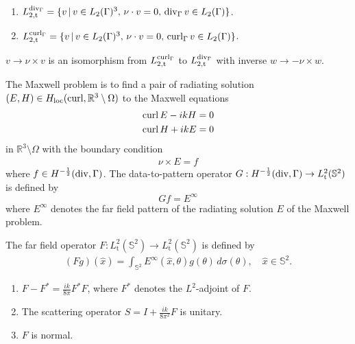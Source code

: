 \begin{enumerate}
  \item $L_{2,\text{t}}^{\operatorname{div}_\Gamma} = \{v\,|\,v\in L_2(\Gamma)^3,\, \nu\cdot v=0, \,\operatorname{div}_\Gamma v\in L_2(\Gamma)\}$.
  \item $L_{2,\text{t}}^{\operatorname{curl}_\Gamma} = \{v\,|\,v\in L_2(\Gamma)^3,\, \nu\cdot v=0, \,\operatorname{curl}_\Gamma v\in L_2(\Gamma)\}$.
\end{enumerate}

\begin{prp}
  $v\to\nu\times v$ is an isomorphism from $L_{2,\text{t}}^{\operatorname{curl}_\Gamma}$ to $L_{2,\text{t}}^{\operatorname{div}_\Gamma}$ with inverse $w\to -\nu\times w$.
\end{prp}

\begin{dfn}
  The Maxwell problem is to find a pair of radiating solution $(E, H)\in H_\text{loc}(\operatorname{curl}, \mathbb{R}^3\setminus\Omega)$ to the Maxwell equations
  \begin{align*}
    \operatorname{curl} E - ikH &= 0\\
    \operatorname{curl} H + ikE &= 0
  \end{align*}
  in $\mathbb{R}^3\setminus\Omega$ with the boundary condition
  \begin{align*}
    \nu\times E = f
  \end{align*}
  where $f\in H^{-\frac{1}{2}}(\operatorname{div}, \Gamma)$. The data-to-pattern operator $G:H^{-\frac{1}{2}}(\operatorname{div}, \Gamma)\rightarrow L_\text{t}^2(\mathbb{S}^2)$ is defined by $$Gf=E^\infty$$ where $E^\infty$ denotes the far field pattern of the radiating solution $E$ of the Maxwell problem.
\end{dfn}

\begin{dfn}
  The far field operator $F:L_\text{t}^2(\mathbb{S}^2)\rightarrow L_\text{t}^2(\mathbb{S}^2)$ is defined by 
  \begin{align}
    (Fg)(\hat{x})=\int_{\mathbb{S}^2} E^\infty(\hat{x}, \theta)g(\theta)\,d\sigma(\theta),\quad\hat{x}\in \mathbb{S}^2.
  \end{align}
\end{dfn}

\begin{prp}
  \begin{enumerate}
    \item $F - F^* = \frac{ik}{8\pi}F^*F$, where $F^*$ denotes the $L^2$-adjoint of $F$.
    \item The scattering operator $S=I+\frac{ik}{8\pi^2}F$ is unitary.
    \item $F$ is normal.
  \end{enumerate}
\end{prp}

